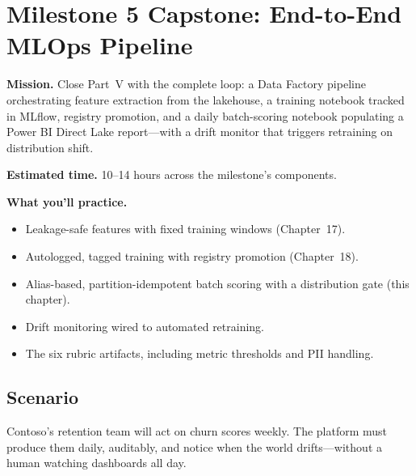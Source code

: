 \section{Milestone 5 Capstone: End-to-End MLOps Pipeline}\label{sec:ch20-capstone}

\begin{capstonebox}
\textbf{Mission.} Close Part~V with the complete loop: a Data Factory pipeline orchestrating feature extraction from the lakehouse, a training notebook tracked in MLflow, registry promotion, and a daily batch-scoring notebook populating a Power BI Direct Lake report---with a drift monitor that triggers retraining on distribution shift.

\textbf{Estimated time.} 10--14 hours across the milestone's components.

\textbf{What you'll practice.}
\begin{itemize}
    \item Leakage-safe features with fixed training windows (Chapter~17).
    \item Autologged, tagged training with registry promotion (Chapter~18).
    \item Alias-based, partition-idempotent batch scoring with a distribution gate (this chapter).
    \item Drift monitoring wired to automated retraining.
    \item The six rubric artifacts, including metric thresholds and PII handling.
\end{itemize}
\end{capstonebox}

\subsection*{Scenario}
Contoso's retention team will act on churn scores weekly. The platform must produce them daily, auditably, and notice when the world drifts---without a human watching dashboards all day.

